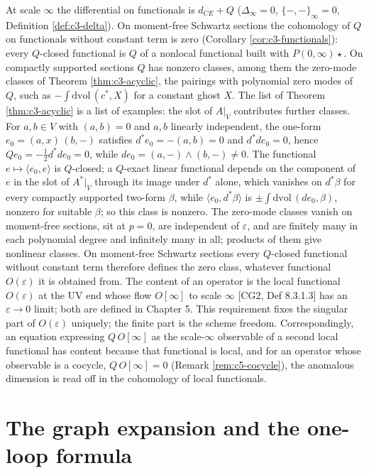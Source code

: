 \begin{remark}
\label{rem:c3-story}
At scale $\infty$ the differential on functionals is $d_{CE}+Q$ ($\Delta_\infty=0$, $\{-,-\}_\infty=0$, Definition \ref{def:c3-delta}). On moment-free Schwartz sections the cohomology of $Q$ on functionals without constant term is zero (Corollary \ref{cor:c3-functionals}): every $Q$-closed functional is $Q$ of a nonlocal functional built with $P(0,\infty)\star$. On compactly supported sections $Q$ has nonzero classes, among them the zero-mode classes of Theorem \ref{thm:c3-acyclic}, the pairings with polynomial zero modes of $Q$, such as $-\int\mathrm{dvol}\,(c^*,X)$ for a constant ghost $X$. The list of Theorem \ref{thm:c3-acyclic} is a list of examples: the slot of $A|_V$ contributes further classes. For $a,b\in V$ with $(a,b)=0$ and $a,b$ linearly independent, the one-form $e_0=(a,x)\,(b,-)$ satisfies $d^*e_0=-(a,b)=0$ and $d^*de_0=0$, hence $Qe_0=-\tfrac12d^*de_0=0$, while $de_0=(a,-)\wedge(b,-)\neq0$. The functional $e\mapsto\langle e_0,e\rangle$ is $Q$-closed; a $Q$-exact linear functional depends on the component of $e$ in the slot of $A^*|_V$ through its image under $d^*$ alone, which vanishes on $d^*\beta$ for every compactly supported two-form $\beta$, while $\langle e_0,d^*\beta\rangle$ is $\pm\int\mathrm{dvol}\,(de_0,\beta)$, nonzero for suitable $\beta$; so this class is nonzero. The zero-mode classes vanish on moment-free sections, sit at $p=0$, are independent of $\varepsilon$, and are finitely many in each polynomial degree and infinitely many in all; products of them give nonlinear classes. On moment-free Schwartz sections every $Q$-closed functional without constant term therefore defines the zero class, whatever functional $O(\varepsilon)$ it is obtained from. The content of an operator is the local functional $O(\varepsilon)$ at the UV end whose flow $O[\infty]$ to scale $\infty$ [CG2, Def 8.3.1.3] has an $\varepsilon\to0$ limit; both are defined in Chapter 5. This requirement fixes the singular part of $O(\varepsilon)$ uniquely; the finite part is the scheme freedom. Correspondingly, an equation expressing $Q\,O[\infty]$ as the scale-$\infty$ observable of a second local functional has content because that functional is local, and for an operator whose observable is a cocycle, $Q\,O[\infty]=0$ (Remark \ref{rem:c5-cocycle}), the anomalous dimension is read off in the cohomology of local functionals.
\end{remark}

\section{The graph expansion and the one-loop formula}

